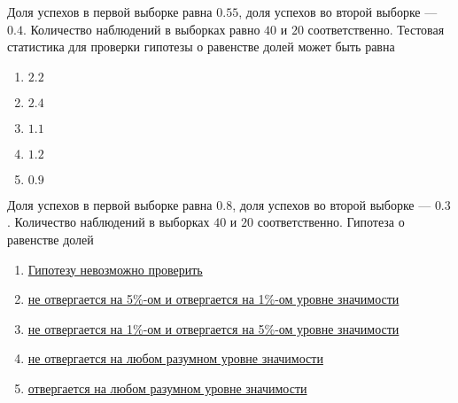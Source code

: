 \documentclass[t]{beamer}
\begin{document}
 \begin{frame} \label{9} 
\begin{block}{9} 

  Доля успехов в первой выборке равна $0.55$, доля успехов во второй выборке — $0.4$. Количество наблюдений в выборках равно $40$ и $20$ соответственно. Тестовая статистика для проверки гипотезы о равенстве долей может быть равна
  


 \end{block} 
\begin{enumerate} 
\item[] \hyperlink{9-No}{\beamergotobutton{} $2.2$}
\item[] \hyperlink{9-No}{\beamergotobutton{} $2.4$}
\item[] \hyperlink{9-Yes}{\beamergotobutton{} $1.1$}
\item[] \hyperlink{9-No}{\beamergotobutton{} $1.2$}
\item[] \hyperlink{9-No}{\beamergotobutton{} $0.9$}
\end{enumerate} 
\end{frame} 


 \begin{frame} \label{10} 
\begin{block}{10} 

  Доля успехов в первой выборке равна $0.8$, доля успехов во второй выборке — $0.3$. Количество наблюдений в выборках $40$ и $20$ соответственно. Гипотеза о равенстве долей
  


 \end{block} 
\begin{enumerate} 
\item[] \hyperlink{10-No}{\beamergotobutton{} Гипотезу невозможно проверить}
\item[] \hyperlink{10-No}{\beamergotobutton{} не отвергается на 5\%-ом и отвергается на 1\%-ом уровне значимости}
\item[] \hyperlink{10-No}{\beamergotobutton{} не отвергается на 1\%-ом и отвергается на 5\%-ом уровне значимости}
\item[] \hyperlink{10-No}{\beamergotobutton{} не отвергается на любом разумном уровне значимости}
\item[] \hyperlink{10-Yes}{\beamergotobutton{} отвергается на любом разумном уровне значимости}
\end{enumerate} 
\end{frame} 
\end{document}
